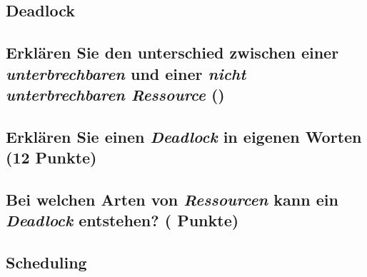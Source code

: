\documentclass[9pt]{article}
\begin{document}
\bigskip
\begin{center}
  \begin{minipage}{0.9\linewidth}
    \section{Deadlock}
    \subsection{Erklären Sie den unterschied zwischen einer \textsl{unterbrechbaren} und einer \textsl{nicht unterbrechbaren Ressource} ()}
    \subsection{Erklären Sie einen \textsl{Deadlock} in eigenen Worten (12 Punkte)}
    \subsection{Bei welchen Arten von \textsl{Ressourcen} kann ein \textsl{Deadlock} entstehen? ( Punkte)}
  \end{minipage}
\end{center}

\begin{center}
  \begin{minipage}{0.9\linewidth}
    \section{Scheduling}
  \end{minipage}
\end{center}
\end{document}
